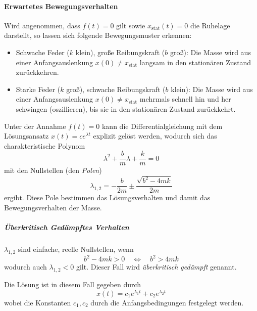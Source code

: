 \documentclass[a4paper, 11pt, accentcolor = tud3b]{tudreport}
\begin{document}
					\paragraph{Erwartetes Bewegungsverhalten}
						Wird angenommen, dass \( f(t) = 0 \) gilt sowie \( x_\text{stat}(t) = 0 \) die Ruhelage darstellt, so lassen sich folgende Bewegungsmuster erkennen:
						\begin{itemize}
							\item Schwache Feder (\(k\) klein), große Reibungskraft (\(b\) groß): Die Masse wird aus einer Anfangsauslenkung \( x(0) \neq x_\text{stat} \) langsam in den stationären Zustand zurückkehren.
							\item Starke Feder (\(k\) groß), schwache Reibungskraft (\(b\) klein): Die Masse wird aus einer Anfangsauslenkung \( x(0) \neq x_\text{stat} \) mehrmals schnell hin und her schwingen (oszillieren), bis sie in den stationären Zustand zurückkehrt.
						\end{itemize}
					
						Unter der Annahme \( f(t) = 0 \) kann die Differentialgleichung mit dem Lösungsansatz \( x(t) = ce^{\lambda t} \) explizit gelöst werden, wodurch sich das charakteristische Polynom
						\begin{equation*}
							\lambda^2 + \frac{b}{m} \lambda + \frac{k}{m} = 0
						\end{equation*}
						mit den Nullstellen (den \emph{Polen})
						\begin{equation*}
							\lambda_{1, 2} = -\frac{b}{2m} \pm \frac{\sqrt{b^2 - 4mk}}{2m}
						\end{equation*}
						ergibt. Diese Pole bestimmen das Lösungsverhalten und damit das Bewegungsverhalten der Masse.
						
						\subparagraph{Überkritisch Gedämpftes Verhalten}
							\( \lambda_{1, 2} \) sind einfache, reelle Nullstellen, wenn
							\begin{equation*}
								b^2 - 4mk > 0 \quad\iff\quad b^2 > 4mk
							\end{equation*}
							wodurch auch \( \lambda_{1, 2} < 0 \) gilt. Dieser Fall wird \emph{überkritisch gedämpft} genannt.
							
							Die Lösung ist in diesem Fall gegeben durch
							\begin{equation*}
								x(t) = c_1 e^{\lambda_1 t} + c_2 e^{\lambda_2 t}
							\end{equation*}
							wobei die Konstanten \( c_1, c_2 \) durch die Anfangsbedingungen festgelegt werden.
						
\end{document}
